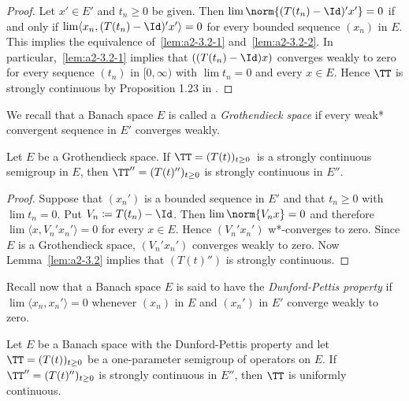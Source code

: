 \begin{proof}
Let $x' \in E'$ and $t_n \geq 0$ be given.
Then $\lim \norm{(T(t_n) - \Id)'x'} = 0$ if and only if\/ $\lim \langle x_n, (T(t_n) - \Id)'x' \rangle = 0$ for every bounded sequence $(x_n)$ in $E$.
This implies the equivalence of~\ref{lem:a2-3.2-1}   and~\ref{lem:a2-3.2-2}. 
In particular,~\ref{lem:a2-3.2-1}   implies that $((T(t_n) - \Id)x)$ converges weakly to zero for every sequence $(t_n)$ in $[0,\infty)$ with $\lim t_n = 0$ and every $x \in E$.
Hence $\TT$ is strongly continuous by Proposition 1.23 
in \textcite{davies:1980}.
\end{proof}

We recall that a Banach space $E$ is called a \emph{Grothendieck space} if every weak* convergent sequence in $E'$ converges weakly.
\begin{theorem}\label{thm:a2-3.3}
Let $E$ be a Grothendieck space.
If  $\TT=(T(t))_{t \geq 0}$\, is a strongly continuous semigroup in $E$, then $\TT'' = (T(t)'')_{t \geq 0}$ is strongly continuous in $E''$.
\end{theorem}

\begin{proof}
Suppose that $(x_{n}')$ is a bounded sequence in $E'$ and that $t_{n} \geq 0$ with $\lim t_{n} = 0$.
Put $V_{n} \coloneqq T(t_{n}) - \Id$.
Then $\lim \norm{V_{n}x} = 0$ and therefore $\lim \langle x, V_{n}'x_{n}' \rangle = 0$ for every $x \in E$.
Hence $(V_{n}'x_{n}')$ w*-converges to zero.
Since $E$ is a Grothendieck space, $(V_{n}'x_{n}')$ converges weakly to zero.
Now Lemma~\ref{lem:a2-3.2} implies that $(T(t)'')$ is strongly continuous.
\end{proof}
Recall now that a Banach space $E$ is said to have the \emph{Dunford-Pettis property} if\/ $\lim \langle x_{n},x_{n}' \rangle = 0$ whenever $(x_{n})$ in $E$ and $(x_{n}')$ in $E'$ converge weakly to zero.
\begin{theorem}\label{thm:a2-3.4}
Let $E$ be a Banach space with the Dunford-Pettis property and let  $\TT = (T(t))_{t \geq 0}$ be a one-parameter semigroup of operators on $E$.
If  $\TT'' = (T(t)'')_{t \geq 0}$ is strongly continuous in $E''$, then $\TT$ is uniformly continuous.
\end{theorem}

